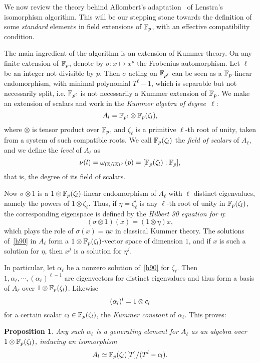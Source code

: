 \documentclass{sig-alternate}
\newtheorem{proposition}[theorem]{Proposition}
\begin{document}
We now review the theory behind Allombert's
adaptation~\cite{Allombert02} of Lenstra's isomorphism
algorithm\cite{LenstraJr91}. %
This will be our stepping stone towards the definition of some
\emph{standard} elements in field extensions of $\mathbb{F}_p$, with an
effective compatibility condition.

The main ingredient of the algorithm is an extension
of Kummer theory.
On any finite extension of $\mathbb{F}_{p}$, denote by $ \sigma:x\mapsto x^p $
the Frobenius automorphism.
Let $\ell$ be an integer not divisible by $p$.
Then $\sigma$ acting on $\mathbb{F}_{p^l}$ can be seen as a $\mathbb{F}_{p}$-linear endomorphism,
with minimal polynomial $T^\ell-1$, which is separable but not necessarily split,
i.e. $\mathbb{F}_{p^l}$ is not necessarily a Kummer extension of $\mathbb{F}_{p}$.
We make an extension of scalars and work in the
\emph{Kummer algebra of degree~$\ell$}:
\[
  A_l = \mathbb{F}_{p^l}\otimes\mathbb{F}_{p}(\zeta_l),
\]
where $\otimes$ is tensor product over $\mathbb{F}_{p}$, and $\zeta_\ell$ is a primitive $\ell$-th root of unity, taken from a system of such compatible roots. We
call $\mathbb{F}_{p}(\zeta_l)$ the \emph{field of scalars} of $A_\ell$, and
we define the \emph{level} of $A_\ell$ as
\[
  \nu(l) = \omega_{(\mathbb{Z}/l\mathbb{Z})^\times}(p) = [\mathbb{F}_{p}(\zeta_l):\mathbb{F}_{p}],
\]
that is, the degree of its field of scalars.

Now $\sigma\otimes1$ is a $1\otimes\mathbb{F}_{p}(\zeta_l)$-linear endomorphism of $A_\ell$
with $\ell$ distinct eigenvalues, namely the powers of $1\otimes\zeta_\ell$.
Thus, if $\eta=\zeta_\ell^i$ is any $\ell$-th root of unity in $\mathbb{F}_{p}(\zeta_l)$,
the corresponding eigenspace is defined by the \emph{Hilbert 90 equation for $\eta$}:
\begin{equation}
  \tag{H90}
 (\sigma\otimes1)(x) = (1\otimes\eta)x,
  \label{h90}
\end{equation}
which plays the role of $\sigma(x)=\eta x$ in classical Kummer theory.
The solutions of~\eqref{h90} in $A_\ell$ form a
$1\otimes\mathbb{F}_{p}(\zeta_{l})$-vector space of dimension $1$,
and if $x$ is such a solution for $\eta$, then $x^j$ is a solution for $\eta^j$.

In particular, let $\alpha_\ell$ be a nonzero solution of~\eqref{h90} for $\zeta_\ell$.
Then $1,\alpha_\ell,\cdots,(\alpha_\ell)^{\ell-1}$ are eigenvectors for distinct eigenvalues and thus
form a basis of $A_\ell$ over $1\otimes\mathbb{F}_{p}(\zeta_{l})$.
Likewise
\[ (\alpha_l)^l = 1\otimes c_l \]
for a certain scalar $c_l\in\mathbb{F}_{p}(\zeta_l)$,
the \emph{Kummer constant} of $\alpha_\ell$.
This proves:
\begin{proposition}
\label{alphagen}
Any such $\alpha_\ell$ is a generating element for $A_\ell$ as an algebra over $1\otimes\mathbb{F}_{p}(\zeta_{l})$,
inducing an isomorphism
\[ A_l\simeq \mathbb{F}_{p}(\zeta_{l})[T]/(T^l-c_l). \]
\end{proposition}
\end{document}
